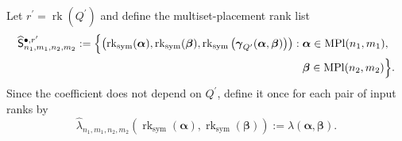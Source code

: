\documentclass{amsart}
\theoremstyle{definition}
\theoremstyle{remark}
\begin{document}
Let
$r^{\prime}=\operatorname{rk}(Q^{\prime})$ and define the
multiset-placement rank list
\[
\begin{aligned}
    \widehat{\mathsf{S}}^{
        \bullet,r^{\prime}
    }_{n_1,m_1,n_2,m_2}
    :=
    \Bigl\{
        \bigl(
            \operatorname{rk}_{\mathrm{sym}}(\boldsymbol{\alpha}),
            \operatorname{rk}_{\mathrm{sym}}(\boldsymbol{\beta}),
            \operatorname{rk}_{\mathrm{sym}}
            \left(
                \boldsymbol{\gamma}_{Q^{\prime}}
                (\boldsymbol{\alpha},\boldsymbol{\beta})
            \right)
        \bigr)
        :\;&
        \boldsymbol{\alpha}
        \in
        \operatorname{MPl}(n_1,m_1),
        \\
        &
        \boldsymbol{\beta}
        \in
        \operatorname{MPl}(n_2,m_2)
    \Bigr\}.
\end{aligned}
\]
Since the coefficient does not depend on $Q^{\prime}$, define it once
for each pair of input ranks by
\[
    \widehat{\lambda}_{n_1,m_1,n_2,m_2}
    \left(
        \operatorname{rk}_{\mathrm{sym}}(\boldsymbol{\alpha}),
        \operatorname{rk}_{\mathrm{sym}}(\boldsymbol{\beta})
    \right)
    :=
    \lambda(\boldsymbol{\alpha},\boldsymbol{\beta}).
\]
\end{document}
